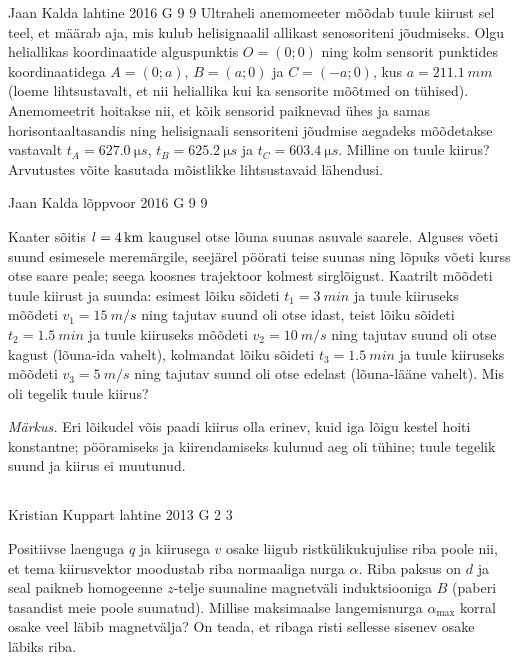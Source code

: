 \documentclass[11pt, twoside]{article}
\begin{document}
{%
{Jaan Kalda} %
{lahtine} %
{2016} %
{G 9} %
{9} %
{
\ifStatement
Ultraheli anemomeeter mõõdab tuule kiirust sel teel, et määrab aja, mis kulub helisignaalil allikast senosoriteni jõudmiseks.
Olgu heliallikas koordinaatide alguspunktis $O=(0;0)$ ning kolm sensorit punktides koordinaatidega $A=(0;a)$, $B=(a;0)$ ja $C=(-a;0)$, 
kus $a=\SI{211.1}{mm}$ (loeme lihtsustavalt, et nii heliallika kui ka sensorite mõõtmed on tühised). 
Anemomeetrit hoitakse nii, et kõik sensorid paiknevad ühes ja samas horisontaaltasandis ning helisignaali 
sensoriteni jõudmise aegadeks mõõdetakse vastavalt $t_A=\SI{627,0}{\micro s}$, $t_B=\SI{625,2}{\micro s}$ ja $t_C=\SI{603,4}{\micro s}$. 
Milline on tuule kiirus? Arvutustes võite kasutada mõistlikke lihtsustavaid lähendusi.
\fi
}

{Jaan Kalda} %
{lõppvoor} %
{2016} %
{G 9} %
{9} %
{
\ifStatement
Kaater sõitis $l=\SI 4{km}$ kaugusel otse lõuna suunas asuvale saarele. 
Alguses võeti suund esimesele meremärgile, seejärel pöörati teise suunas ning lõpuks võeti kurss otse saare peale; seega koosnes trajektoor kolmest sirglõigust. Kaatrilt mõõdeti tuule kiirust ja suunda: esimest lõiku sõideti $t_1=\SI{3}{min}$ ja tuule kiiruseks mõõdeti $v_1=\SI{15}{m/s}$ ning tajutav suund oli otse idast, teist lõiku sõideti $t_2=\SI{1,5}{min}$ ja tuule kiiruseks mõõdeti $v_2=\SI{10}{m/s}$ ning tajutav suund oli otse kagust (lõuna-ida vahelt), kolmandat lõiku sõideti $t_3=\SI{1,5}{min}$ ja tuule kiiruseks mõõdeti $v_3=\SI{5}{m/s}$ ning tajutav suund oli otse edelast (lõuna-lääne vahelt). Mis oli tegelik tuule kiirus?

\emph{Märkus.} Eri lõikudel võis paadi kiirus olla erinev, kuid iga lõigu kestel hoiti konstantne; pööramiseks ja kiirendamiseks kulunud aeg oli tühine; tuule tegelik suund ja kiirus ei muutunud. 
\fi
}
\newpage\subsection{\protect{}}

{Kristian Kuppart} %
{lahtine} %
{2013} %
{G 2} %
{3} %
{
\ifStatement
Positiivse laenguga $q$ ja kiirusega $v$ osake liigub ristkülikukujulise riba poole nii, et tema kiirusvektor
moodustab riba normaaliga nurga $\alpha$. Riba paksus on $d$ ja seal paikneb
homogeenne $z$-telje suunaline
magnetväli induktsiooniga $B$ (paberi tasandist meie poole suunatud). Millise maksimaalse
langemisnurga $\alpha_{\mathrm{max}}$ korral
osake veel läbib magnetvälja? On teada, et ribaga risti sellesse sisenev osake
läbiks riba.

}}
\end{document}
